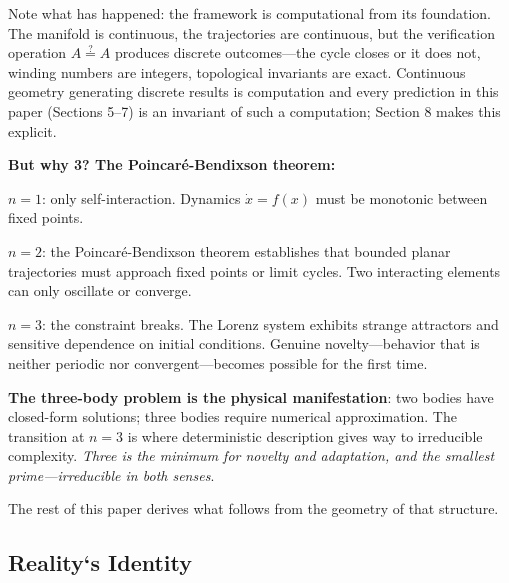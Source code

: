 \documentclass[12pt]{article}
\begin{document}
Note what has happened: the framework is computational from its foundation. The manifold is continuous, the trajectories are continuous, but the verification operation $A \stackrel{?}{=} A$ produces discrete outcomes---the cycle closes or it does not, winding numbers are integers, topological invariants are exact. Continuous geometry generating discrete results is computation and every prediction in this paper (Sections 5--7) is an invariant of such a computation; Section 8 makes this explicit.



\textbf{But why 3? The Poincar\'e-Bendixson theorem:}

$n = 1$: only self-interaction. Dynamics $\dot{x} = f(x)$ must be monotonic between fixed points.

$n = 2$: the Poincar\'e-Bendixson theorem \cite{poincare_bendixson} establishes that bounded planar trajectories must approach fixed points or limit cycles. Two interacting elements can only oscillate or converge.

$n = 3$: the constraint breaks. The Lorenz system \cite{lorenz1963} exhibits strange attractors and sensitive dependence on initial conditions. Genuine novelty---behavior that is neither periodic nor convergent---becomes possible for the first time.

\textbf{The three-body problem is the physical manifestation}: two bodies have closed-form solutions; three bodies require numerical approximation. The transition at $n = 3$ is where deterministic description gives way to irreducible complexity. \textit{Three is the minimum for novelty and adaptation, and the smallest prime---irreducible in both senses}.

The rest of this paper derives what follows from the geometry of that structure.


\begin{center}
\end{center}



\subsection{Reality`s Identity}
\end{document}
